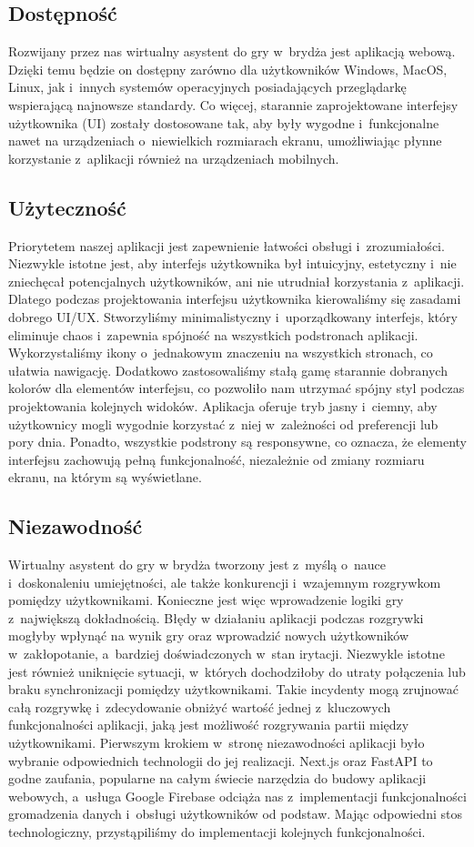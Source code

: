 \subsection{Dostępność}
Rozwijany przez nas wirtualny asystent do gry w~brydża jest aplikacją
webową. Dzięki temu będzie on dostępny zarówno dla użytkowników
Windows, MacOS, Linux, jak i~innych systemów operacyjnych posiadających
przeglądarkę wspierającą najnowsze standardy. Co więcej, starannie
zaprojektowane interfejsy użytkownika (UI) zostały dostosowane tak,
aby były wygodne i~funkcjonalne nawet na urządzeniach o~niewielkich
rozmiarach ekranu, umożliwiając płynne korzystanie z~aplikacji również
na urządzeniach mobilnych.
\subsection{Użyteczność}
Priorytetem naszej aplikacji jest zapewnienie łatwości obsługi
i~zrozumiałości. Niezwykle istotne jest, aby interfejs użytkownika
był intuicyjny, estetyczny i~nie zniechęcał potencjalnych użytkowników,
ani nie utrudniał korzystania z~aplikacji. Dlatego podczas projektowania
interfejsu użytkownika kierowaliśmy się zasadami dobrego UI/UX.
Stworzyliśmy minimalistyczny i~uporządkowany interfejs, który eliminuje
chaos i~zapewnia spójność na wszystkich podstronach aplikacji.
Wykorzystaliśmy ikony o~jednakowym znaczeniu na wszystkich stronach,
co ułatwia nawigację. Dodatkowo zastosowaliśmy stałą gamę starannie
dobranych kolorów dla elementów interfejsu, co pozwoliło nam utrzymać
spójny styl podczas projektowania kolejnych widoków. Aplikacja oferuje
tryb jasny i~ciemny, aby użytkownicy mogli wygodnie korzystać z~niej
w~zależności od preferencji lub pory dnia. Ponadto, wszystkie podstrony
są responsywne, co oznacza, że elementy interfejsu zachowują pełną
funkcjonalność, niezależnie od zmiany rozmiaru ekranu, na którym są
wyświetlane.
\subsection{Niezawodność}
Wirtualny asystent do gry w brydża tworzony jest z~myślą o~nauce
i~doskonaleniu umiejętności, ale także konkurencji i~wzajemnym
rozgrywkom pomiędzy użytkownikami. Konieczne jest więc wprowadzenie logiki
gry z~największą dokładnością. Błędy w działaniu aplikacji podczas
rozgrywki mogłyby wpłynąć na wynik gry oraz wprowadzić nowych użytkowników
w~zakłopotanie, a~bardziej doświadczonych w~stan irytacji.
Niezwykle istotne jest również uniknięcie sytuacji, w~których
dochodziłoby do utraty połączenia lub braku synchronizacji pomiędzy
użytkownikami. Takie incydenty mogą zrujnować całą rozgrywkę i~zdecydowanie
obniżyć wartość jednej z~kluczowych funkcjonalności aplikacji, jaką
jest możliwość rozgrywania partii między użytkownikami.
Pierwszym krokiem w~stronę niezawodności aplikacji było wybranie
odpowiednich technologii do jej realizacji. Next.js oraz FastAPI %
to godne zaufania, popularne na całym świecie narzędzia do budowy
aplikacji webowych, a~usługa Google Firebase odciąża nas z~implementacji
funkcjonalności gromadzenia danych i~obsługi użytkowników od podstaw.
Mając odpowiedni stos technologiczny, przystąpiliśmy do implementacji
kolejnych funkcjonalności.

